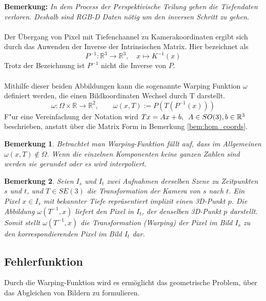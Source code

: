 \documentclass[12pt,DIV=15,BCOR=15mm,twoside,headsepline,abstract=true,listof=totoc,bibliography=totoc]{scrreprt}
\newtheorem{remark}{Bemerkung}[chapter]
\theoremstyle{remark}    %
\begin{document}
    \textbf{Bemerkung:} \emph{In dem Process der Perspektivische Teilung gehen die Tiefendaten verloren. Deshalb sind RGB-D Daten nötig um den inversen 
    Schritt zu gehen.}\\\\
    Der Übergang von Pixel mit Tiefenchannel zu Kamerakoordinaten ergibt sich durch das Anwenden der Inverse der Intrinsischen Matrix. Hier bezeichnet als
    \[ P^{-1}: \mathbb{R}^3 \to \mathbb{R}^3, \hspace{1em} x \mapsto K^{-1}(x)\] 
    Trotz der Bezeichnung ist $P^{-1}$ nicht die Inverse von $P$.\\\\
    Mithilfe dieser beiden Abbildungen kann die sogenannte  Warping Funktion $\omega$ definiert werden, die einen Bildkoordinaten Wechsel
    durch T darstellt.
    \[
        \omega: \Omega \times \mathbb{R} \to \mathbb{R}^2, \hspace{2em} \omega (x,T) := P(T(P^{-1}(x)))
    \]
    F"ur eine Vereinfachung der Notation wird $Tx = Ax + b, \hspace{0.5em} A \in SO(3), b \in \mathbb{R}^3$ beschrieben, anstatt über die 
    Matrix Form in Bemerkung \ref{bem:hom_coords}.
    \begin{remark}
        Betrachtet man Warping-Funktion fällt auf, dass im Allgemeinen $\omega(x,T) \notin \Omega$.
        Wenn die einzelnen Komponenten keine ganzen Zahlen sind werden sie gerundet oder es wird interpoliert.
    \end{remark}
    \begin{remark}
        Seien $I_s$ und $I_t$ zwei Aufnahmen derselben Szene zu Zeitpunkten $s$ und $t$, 
        und $T \in SE(3)$ die Transformation der Kamera von $s$ nach $t$. Ein Pixel $x \in I_s$ mit bekannter Tiefe repräsentiert implizit einen 3D-Punkt $p$. 
        Die Abbildung $\omega(T^{-1}, x)$ liefert den Pixel in $I_t$, der denselben 3D-Punkt $p$ darstellt. \\
        Somit stellt $\omega(T^{-1}, x)$ die Transformation (Warping) der Pixel im Bild $I_s$ zu den korrespondierenden Pixel im Bild $I_t$ dar.
    \end{remark}
    
    \subsection{Fehlerfunktion}
    \label{Fehlerfunktion}
    Durch die Warping-Funktion wird es ermöglicht das geometrische Problem, über das Abgleichen von Bildern zu formulieren.
\end{document}

